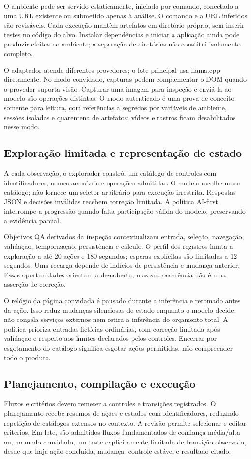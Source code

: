 \documentclass[12pt]{article}
\begin{document}
O ambiente pode ser servido estaticamente, iniciado por comando, conectado a uma URL existente ou submetido apenas à análise. O comando e a URL inferidos são revisáveis. Cada execução mantém artefatos em diretório próprio, sem inserir testes no código do alvo. Instalar dependências e iniciar a aplicação ainda pode produzir efeitos no ambiente; a separação de diretórios não constitui isolamento completo.

O adaptador atende diferentes provedores; o lote principal usa llama.cpp diretamente. No modo convidado, capturas podem complementar o DOM quando o provedor suporta visão. Capturar uma imagem para inspeção e enviá-la ao modelo são operações distintas. O modo autenticado é uma prova de conceito somente para leitura, com referências a segredos por variáveis de ambiente, sessões isoladas e quarentena de artefatos; vídeos e rastros ficam desabilitados nesse modo.

\subsection{Exploração limitada e representação de estado}
A cada observação, o explorador constrói um catálogo de controles com identificadores, nomes acessíveis e operações admitidas. O modelo escolhe nesse catálogo; não fornece um seletor arbitrário para execução irrestrita. Respostas JSON e decisões inválidas recebem correção limitada. A política AI-first interrompe a progressão quando falta participação válida do modelo, preservando a evidência parcial.

Objetivos QA derivados da inspeção contextualizam entrada, seleção, navegação, validação, temporização, persistência e cálculo. O perfil dos registros limita a exploração a até 20 ações e 180 segundos; esperas explícitas são limitadas a 12 segundos. Uma recarga depende de indícios de persistência e mudança anterior. Essas oportunidades orientam a descoberta, mas sua ocorrência não é uma asserção de correção.

O relógio da página convidada é pausado durante a inferência e retomado antes da ação. Isso reduz mudanças silenciosas de estado enquanto o modelo decide; não congela serviços externos nem retira a inferência do orçamento total. A política prioriza entradas fictícias ordinárias, com correção limitada após validação e respeito aos limites declarados pelos controles. Encerrar por esgotamento do catálogo significa esgotar ações permitidas, não compreender todo o produto.

\subsection{Planejamento, compilação e execução}
Fluxos e critérios devem remeter a controles e transições registrados. O planejamento recebe resumos de ações e estados com identificadores, reduzindo repetição de catálogos extensos no contexto. A revisão permite selecionar e editar critérios. Em lote, são admitidos fluxos fundamentados de confiança média/alta ou, no modo convidado, um teste explicitamente limitado de transição observada, desde que haja ação concluída, mudança, controle estável e resultado citado.
\end{document}
